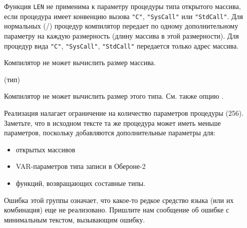 Функция \verb'LEN' не применима к параметру процедуры типа открытого 
массива, если процедура имеет конвенцию вызова
\verb'"C"', \verb'"SysCall"' или \verb'"StdCall"'. 
Для нормальных (\ot{}/\mt{}) процедур компилятор передает по 
одному дополнительному параметру на каждую размерность (длину массива
в этой размерности).
Для процедур вида \verb'"C"', \verb'"SysCall"', \verb'"StdCall"' 
передается только адрес массива.


Компилятор не может вычислить размер массива.

(тип)

Компилятор не может вычислить размер этого типа.
См. также опцию .


Реализация налагает ограничение на количество параметров процедуры
(256). Заметьте, что в исходном тексте та же процедура может иметь
меньше параметров, поскольку добавляются дополнительные параметры для:
\begin{itemize}
\item открытых массивов
\item VAR-параметров типа записи в Обероне-2
\item функций, возвращающих составные типы.
\end{itemize}


Ошибка этой группы означает, что какое-то редкое средство языка
(или их комбинация) еще не реализовано. Пришлите нам сообщение
об ошибке с минимальным текстом, вызывающим ошибку.

